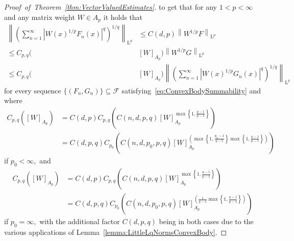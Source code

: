\documentclass{article}
\theoremstyle{definition}
\theoremstyle{remark}
\numberwithin{equation}{section}
\newcommand{\norm}[2]{\left\|{#1}\right\|_{{#2}}}
\newcommand{\cF}{\mathcal{F}}
\newcommand{\Lp}[1]{\mathrm{L}^{#1}}
\newcommand{\1}{\mathbf{1}}
\begin{document}
\begin{proof}[Proof~of~Theorem~\ref{thm:VectorValuedEstimates}]
        to get that for any $1 < p < \infty$ and any matrix weight $W \in A_p$ it holds that
        \begin{equation*}
            \begin{split}
                \norm{\left(\sum_{n=1}^\infty |W(x)^{1/p}F_n(x)|^q\right)^{1/q}}{\Lp{p}}
                &\leq C(d,p) \norm{W^{1/p}F}{\Lp{p}}\\
                \leq  C_{p,q}(&[W]_{A_p}) \norm{W^{1/p}G}{\Lp{p}}\\
                \leq C_{p,q}(&[W]_{A_p}) \norm{\left(\sum_{n=1}^\infty |W(x)^{1/p}G_n(x)|^q\right)^{1/q}}{\Lp{p}}
            \end{split}
        \end{equation*}
        for every sequence $\{(F_n,G_n)\} \subseteq \cF$ satisfying~\eqref{eq:ConvexBodySummability}
        and where
        \begin{equation*}
            \begin{split}
                C_{p,q}([W]_{A_p}) &= C(d,p) C_{p,q}\left(C(n,d,p,q) [W]_{A_p}^{\max\left\{1,\frac{q-1}{p-1}\right\}}\right)\\
                &= C(d,p,q) C_{p_0}\left(C(n,d,p_0,p,q) [W]_{A_p}^{\left(\max\left\{1,\frac{p_0-1}{q-1}\right\}\max\left\{1,\frac{q-1}{p-1}\right\}\right)}\right)
            \end{split}
        \end{equation*}
        if $p_0<\infty,$ and
        \begin{equation*}
            \begin{split}
                C_{p,q}([W]_{A_p}) &= C(d,p) C_{p,q}\left(C(n,d,p,q) [W]_{A_p}^{\max\left\{1,\frac{q-1}{p-1}\right\}}\right)\\
                &= C(d,p,q) C_{p_0}\left(C(n,d,p_0,p,q) [W]_{A_p}^{\left(\frac{1}{q-1}\max\left\{1,\frac{q-1}{p-1}\right\}\right)}\right)
            \end{split}
        \end{equation*}
        if $p_0=\infty,$ with the additional factor $C(d,p,q)$ being in both cases due to the various applications of Lemma~\ref{lemma:LittleLqNormsConvexBody}.
    \end{proof}
\end{document}
